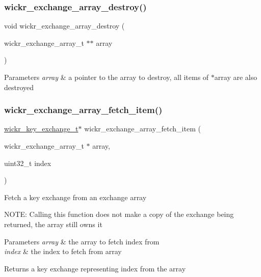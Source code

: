 \subsubsection{\texorpdfstring{wickr\+\_\+exchange\+\_\+array\+\_\+destroy()}{wickr\_exchange\_array\_destroy()}}
{\footnotesize\ttfamily void wickr\+\_\+exchange\+\_\+array\+\_\+destroy (\begin{DoxyParamCaption}\item[{wickr\+\_\+exchange\+\_\+array\+\_\+t $\ast$$\ast$}]{array }\end{DoxyParamCaption})}


\begin{DoxyParams}{Parameters}
{\em array} & a pointer to the array to destroy, all items of \textquotesingle{}$\ast$array\textquotesingle{} are also destroyed \\
\hline
\end{DoxyParams}
\mbox{\label{group__wickr__protocol_ga333510c3c7eeb8e33f94495de6bb122d}} 
\subsubsection{\texorpdfstring{wickr\+\_\+exchange\+\_\+array\+\_\+fetch\+\_\+item()}{wickr\_exchange\_array\_fetch\_item()}}
{\footnotesize\ttfamily \hyperlink{structwickr__key__exchange}{wickr\+\_\+key\+\_\+exchange\+\_\+t}$\ast$ wickr\+\_\+exchange\+\_\+array\+\_\+fetch\+\_\+item (\begin{DoxyParamCaption}\item[{wickr\+\_\+exchange\+\_\+array\+\_\+t $\ast$}]{array,  }\item[{uint32\+\_\+t}]{index }\end{DoxyParamCaption})}

Fetch a key exchange from an exchange array

N\+O\+TE\+: Calling this function does not make a copy of the exchange being returned, the array still owns it


\begin{DoxyParams}{Parameters}
{\em array} & the array to fetch \textquotesingle{}index\textquotesingle{} from \\
\hline
{\em index} & the index to fetch from \textquotesingle{}array\textquotesingle{} \\
\hline
\end{DoxyParams}
\begin{DoxyReturn}{Returns}
a key exchange representing \textquotesingle{}index\textquotesingle{} from the array 
\end{DoxyReturn}
\mbox{\label{group__wickr__protocol_ga907d700b76b748f80796b4404c7172c2}} 
